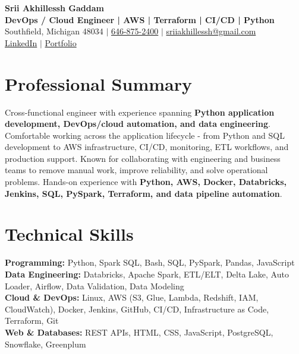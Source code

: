 \documentclass[letterpaper,10pt]{article}
\begin{document}
\fontsize{9.35pt}{10.45pt}\selectfont

\begin{center}
    {\LARGE \textbf{Srii Akhillessh Gaddam}} \\[-1pt]
    \textbf{DevOps / Cloud Engineer | AWS | Terraform | CI/CD | Python} \\[2pt]
    Southfield, Michigan 48034 $|$
    \href{tel:6468752400}{646-875-2400} $|$
    \href{mailto:sriiakhillessh@gmail.com}{sriiakhillessh@gmail.com} \\[1pt]
    \href{https://www.linkedin.com/in/srii-akhiilessh-gaddam-b48668191/}{LinkedIn} $|$
    \href{https://sriiakhillesshg.github.io/portfolio/}{Portfolio}
\end{center}
\vspace{-8pt}

\section{Professional Summary}
\small{Cross-functional engineer with experience spanning \textbf{Python application development, DevOps/cloud automation, and data engineering}. Comfortable working across the application lifecycle - from Python and SQL development to AWS infrastructure, CI/CD, monitoring, ETL workflows, and production support. Known for collaborating with engineering and business teams to remove manual work, improve reliability, and solve operational problems. Hands-on experience with \textbf{Python, AWS, Docker, Databricks, Jenkins, SQL, PySpark, Terraform, and data pipeline automation}.}

\section{Technical Skills}
\small{
\textbf{Programming:} Python, Spark SQL, Bash, SQL, PySpark, Pandas, JavaScript \\
\textbf{Data Engineering:} Databricks, Apache Spark, ETL/ELT, Delta Lake, Auto Loader, Airflow, Data Validation, Data Modeling \\
\textbf{Cloud \& DevOps:} Linux, AWS (S3, Glue, Lambda, Redshift, IAM, CloudWatch), Docker, Jenkins, GitHub, CI/CD, Infrastructure as Code, Terraform, Git \\
\textbf{Web \& Databases:} REST APIs, HTML, CSS, JavaScript, PostgreSQL, Snowflake, Greenplum
}
\end{document}
